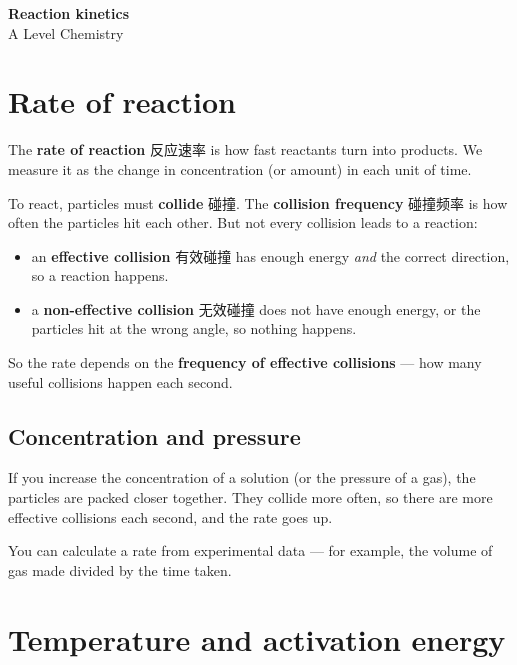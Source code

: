 \documentclass[11pt]{article}
\begin{document}
\begin{center}
  {\LARGE\bfseries Reaction kinetics}\\[0.35em]
  {\large A Level Chemistry}
\end{center}
\vspace{0.6em}

\section*{Rate of reaction}

The \textbf{rate of reaction} 反应速率 is how fast reactants turn into products. We measure it as the change in concentration (or amount) in each unit of time.

To react, particles must \textbf{collide} 碰撞. The \textbf{collision frequency} 碰撞频率 is how often the particles hit each other. But not every collision leads to a reaction:

\begin{itemize}
\item an \textbf{effective collision} 有效碰撞 has enough energy \emph{and} the correct direction, so a reaction happens.

\item a \textbf{non-effective collision} 无效碰撞 does not have enough energy, or the particles hit at the wrong angle, so nothing happens.

\end{itemize}

So the rate depends on the \textbf{frequency of effective collisions} — how many useful collisions happen each second.

\subsection*{Concentration and pressure}

If you increase the concentration of a solution (or the pressure of a gas), the particles are packed closer together. They collide more often, so there are more effective collisions each second, and the rate goes up.

You can calculate a rate from experimental data — for example, the volume of gas made divided by the time taken.

\section*{Temperature and activation energy}
\end{document}
